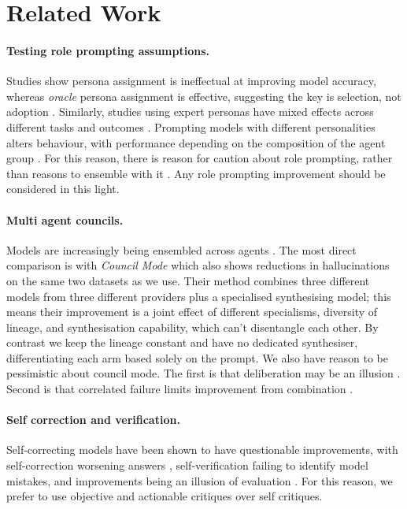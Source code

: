 \section{Related Work}
\label{sec:related}

\paragraph{Testing role prompting assumptions.}
Studies show persona assignment is ineffectual at improving model accuracy, whereas \emph{oracle}
persona assignment is effective, suggesting the key is selection, not adoption
\citep{zheng2024helpful}. Similarly, studies using expert personas have mixed effects across
different tasks and outcomes \citep{hu2026expert}. Prompting models with different personalities
alters behaviour, with performance depending on the composition of the agent group
\citep{yu2025personality}. For this reason, there is reason for caution about role prompting,
rather than reasons to ensemble with it \citep{kim2024persona}. Any role prompting improvement
should be considered in this light.

\paragraph{Multi agent councils.}
Models are increasingly being ensembled across agents
\citep{bause2026mixtures,huang2025dynamics,hamidieh2026complementing}. The most direct comparison
is with \emph{Council Mode} \citep{wu2026council} which also shows reductions in hallucinations on
the same two datasets as we use. Their method combines three different models from three different
providers plus a specialised synthesising model; this means their improvement is a joint effect of
different specialisms, diversity of lineage, and synthesisation capability, which can't disentangle
each other. By contrast we keep the lineage constant and have no dedicated synthesiser,
differentiating each arm based solely on the prompt. We also have reason to be pessimistic about
council mode. The first is that deliberation may be an illusion \citep{wan2026deliberative}. Second
is that correlated failure limits improvement from combination
\citep{jamshidi2026cascade,chen2026cofailure}.

\paragraph{Self correction and verification.}
Self-correcting models have been shown to have questionable improvements, with self-correction
worsening answers \citep{huang2024selfcorrect}, self-verification failing to identify model
mistakes, and improvements being an illusion of evaluation
\citep{chen2026selfcorrection,stechly2024selfverification}. For this reason, we prefer to use
objective and actionable critiques over self critiques.

